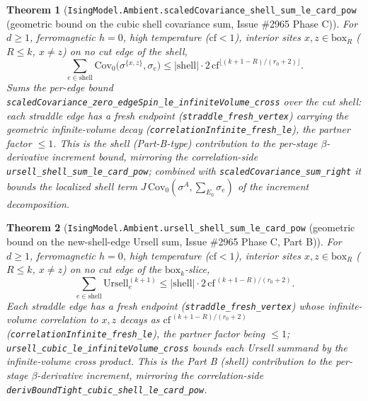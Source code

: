 \documentclass[a4paper,11pt]{article}
\newtheorem{theorem}{Theorem}
\begin{document}
\begin{theorem}[\texttt{IsingModel.Ambient.scaledCovariance\_shell\_sum\_le\_card\_pow}
(geometric bound on the cubic shell covariance sum, Issue \#2965 Phase C)]
For $d\ge1$, ferromagnetic $h=0$, high temperature ($\mathrm{cf}<1$), interior sites
$x,z\in\mathrm{box}_R$ ($R\le k$, $x\ne z$) on no cut edge of the shell,
\[
  \sum_{e\in\mathrm{shell}}\mathrm{Cov}_0\!\bigl(\sigma^{\{x,z\}},\sigma_e\bigr)
    \le |\mathrm{shell}|\cdot 2\,\mathrm{cf}^{\lfloor(k+1-R)/(r_0+2)\rfloor}.
\]
Sums the per-edge bound
\texttt{scaledCovariance\_zero\_edgeSpin\_le\_infiniteVolume\_cross} over the cut shell:
each straddle edge has a fresh endpoint (\texttt{straddle\_fresh\_vertex}) carrying the
geometric infinite-volume decay (\texttt{correlationInfinite\_fresh\_le}), the partner
factor $\le1$. This is the shell (Part-B-type) contribution to the per-stage
$\beta$-derivative increment bound, mirroring the correlation-side
\texttt{ursell\_shell\_sum\_le\_card\_pow}; combined with
\texttt{scaledCovariance\_sum\_right} it bounds the localized shell term
$J\,\mathrm{Cov}_0(\sigma^A,\sum_{E_0}\sigma_e)$ of the increment decomposition.
\end{theorem}

\begin{theorem}[\texttt{IsingModel.Ambient.ursell\_shell\_sum\_le\_card\_pow}
(geometric bound on the new-shell-edge Ursell sum, Issue \#2965 Phase C, Part B)]
For $d\ge1$, ferromagnetic $h=0$, high temperature ($\mathrm{cf}<1$), interior
sites $x,z\in\mathrm{box}_R$ ($R\le k$, $x\neq z$) on no cut edge of the
$\mathrm{box}_k$-slice,
\[
  \sum_{e\in\mathrm{shell}}\mathrm{Ursell}^{(k+1)}_e
    \le |\mathrm{shell}|\cdot 2\,\mathrm{cf}^{\,(k+1-R)/(r_0+2)}.
\]
Each straddle edge has a fresh endpoint
(\texttt{straddle\_fresh\_vertex}) whose infinite-volume correlation to $x,z$ decays
as $\mathrm{cf}^{\,(k+1-R)/(r_0+2)}$ (\texttt{correlationInfinite\_fresh\_le}), the
partner factor being $\le1$; \texttt{ursell\_cubic\_le\_infiniteVolume\_cross} bounds
each Ursell summand by the infinite-volume cross product. This is the Part B (shell)
contribution to the per-stage $\beta$-derivative increment, mirroring the
correlation-side \texttt{derivBoundTight\_cubic\_shell\_le\_card\_pow}.
\end{theorem}
\end{document}
